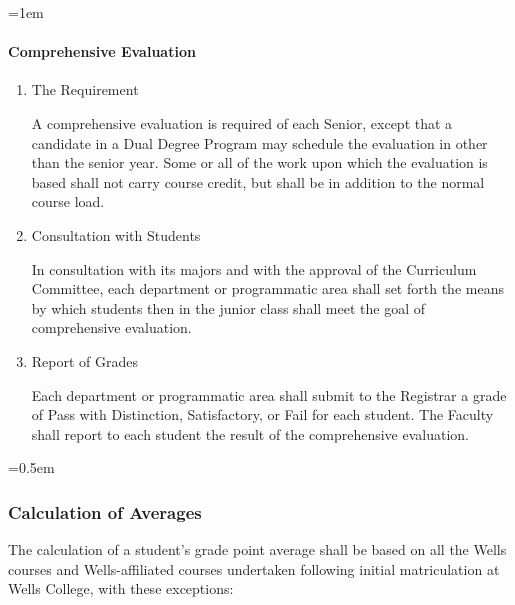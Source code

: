 \documentclass{manual}
\let\oldsubsubsection\subsubsection
\renewcommand\subsubsection{\leftskip=0.5em\oldsubsubsection}
\let\oldparagraph\paragraph
\renewcommand\paragraph{\leftskip=1em\oldparagraph}
\newcommand{\itemLevelA}{\alph*.}
\newcommand{\itemRefA}{\alph*}
\begin{document}
\begin{enumerate}[label=\alph*]
	\end{enumerate}

\paragraph{Comprehensive Evaluation}

	\begin{enumerate}[label=\itemLevelA,ref=\itemRefA]
	\item The Requirement

		A comprehensive evaluation is required of each Senior, except that a candidate in a Dual Degree Program may schedule the evaluation in other than the senior year. Some or all of the work upon which the evaluation is based shall not carry course credit, but shall be in addition to the normal course load.

	\item Consultation with Students

		In consultation with its  majors and with the approval of the Curriculum Committee, each department or programmatic area shall  set forth the means by which students then in the junior class shall meet the goal of comprehensive evaluation.
	
	\item Report of Grades

		Each department or programmatic area shall submit to the Registrar a grade of Pass with Distinction, Satisfactory, or Fail for each student. The Faculty shall report to each student the result of the comprehensive evaluation.
	
	\end{enumerate}

\subsubsection{Calculation of Averages}

The calculation of a student's grade point average shall be based on all the Wells courses and Wells-affiliated courses undertaken following  initial matriculation at Wells College, with these exceptions:
\end{document}
